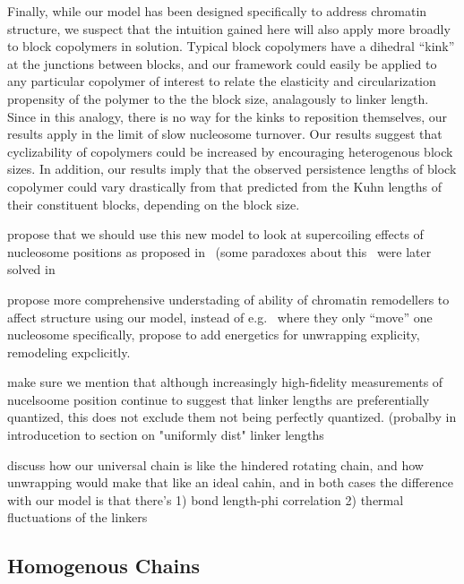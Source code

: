 \documentclass[%
 reprint,
superscriptaddress,
showpacs,preprintnumbers,
 amsmath,amssymb,
 aps,
 prl,
]{revtex4-1}
\begin{document}
Finally, while our model has been designed specifically to address chromatin
    structure, we suspect that the intuition gained here will also apply more
    broadly to block copolymers in solution.
Typical block copolymers have a dihedral ``kink'' at the junctions between
    blocks, and our framework could easily be applied to any particular
    copolymer of interest to relate the elasticity and circularization
    propensity of the polymer to the the block size, analagously to linker
    length.
Since in this analogy, there is no way for the kinks to reposition themselves,
    our results apply in the limit of slow nucleosome turnover.
Our results suggest that cyclizability of copolymers could be increased by
    encouraging heterogenous block sizes.
In addition, our results imply that the observed persistence lengths of block
    copolymer could vary drastically from that predicted from the Kuhn lengths
    of their constituent blocks, depending on the block size.

propose that we should use this new model to look at supercoiling effects
of nucleosome positions as proposed in~\cite{grigoryev1981} (some paradoxes
about this~\cite{prunell1998} were later solved in~\cite{nikitina2017}

propose more comprehensive understading of ability of chromatin
remodellers to affect structure using our model, instead of
e.g.~\cite{muller2014} where they only ``move'' one nucleosome
specifically, propose to add energetics for unwrapping explicity, remodeling
expclicitly.

make sure we mention that although increasingly high-fidelity measurements
of nucelsoome position continue to suggest that linker lengths are
preferentially quantized, this does not exclude them not being perfectly
quantized. (probalby in introducetion to section on "uniformly dist" linker
lengths

discuss how our universal chain is like the hindered rotating chain, and
how unwrapping would make that like an ideal cahin, and in both cases the
difference with our model is that there's 1) bond length-phi correlation 2)
thermal fluctuations of the linkers


\subsection{\label{sec:homo-chain}Homogenous Chains}
\end{document}
